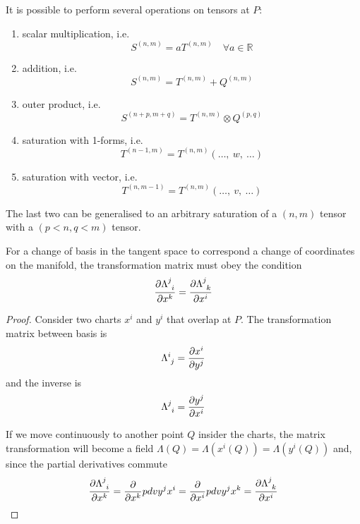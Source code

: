     It is possible to perform several operations on tensors at $P$:
    \begin{enumerate}
        \item scalar multiplication, i.e. 
            \begin{equation*}
                S^{(n,m)} = a T^{(n,m)} \quad \forall a \in \mathbb R
            \end{equation*}
        \item addition, i.e. 
            \begin{equation*}
                S^{(n,m)} = T^{(n,m)} + Q^{(n,m)}
            \end{equation*}
        \item outer product, i.e. 
            \begin{equation*}
                S^{(n+p,m+q)} = T^{(n,m)} \otimes Q^{(p,q)}
            \end{equation*}
        \item saturation with 1-forms, i.e. 
            \begin{equation*}
                T^{(n-1,m)} = T^{(n,m)} (\ldots, ~w, ~\ldots)
            \end{equation*}
        \item saturation with vector, i.e. 
            \begin{equation*}
                T^{(n,m-1)} = T^{(n,m)} (\ldots, ~v, ~\ldots)
            \end{equation*}
    \end{enumerate}
    The last two can be generalised to an arbitrary saturation of a $(n,m)$ tensor with a $(p<n, q<m)$ tensor. 

    For a change of basis in the tangent space to correspond a change of coordinates on the manifold, the transformation matrix must obey the condition
    \begin{equation}\label{proof8}
        \pdv{\Lambda^j_{\phantom j i}}{x^k} = \pdv{\Lambda^j_{\phantom j k}}{x^i}
    \end{equation}

    \begin{proof}
        Consider two charts $x^i$ and $y^i$ that overlap at $P$. The transformation matrix between basis is 
        \begin{equation*}
            \Lambda^i_{\phantom i j} = \pdv{x^i}{y^j}
        \end{equation*}
        and the inverse is 
        \begin{equation*}
            \Lambda^j_{\phantom j i} = \pdv{y^j}{x^i}
        \end{equation*}

        If we move continuously to another point $Q$ insider the charts, the matrix transformation will become a field $\Lambda(Q) = \Lambda(x^i(Q)) = \Lambda(y^i(Q))$ and, since the partial derivatives commute
        \begin{equation*}
            \pdv{\Lambda^j_{\phantom j i}}{x^k} = \pdv{}{x^k} pdv{y^j}{x^i} = \pdv{}{x^i} pdv{y^j}{x^k} = \pdv{\Lambda^j_{\phantom j k}}{x^i}
        \end{equation*}
    \end{proof}

